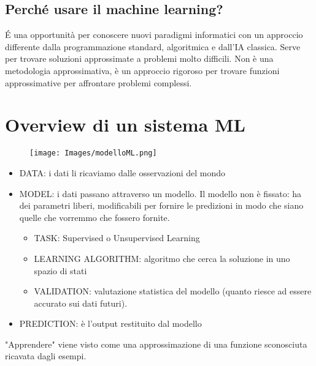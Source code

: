 \documentclass{article}
\begin{document}
\subsection{Perché usare il machine learning?}
É una opportunità per conoscere nuovi paradigmi informatici con un approccio differente dalla programmazione standard, algoritmica e dall'IA classica. Serve per trovare soluzioni approssimate a problemi molto difficili. Non è una metodologia approssimativa, è un approccio rigoroso per trovare funzioni approssimative per affrontare problemi complessi. 

\section{Overview di un sistema ML}
\begin{figure}[H]
    \centering
    \texttt{[image: Images/modelloML.png]}
\end{figure}

\begin{itemize}
    \item DATA: i dati li ricaviamo dalle osservazioni del mondo
    \item MODEL: i dati passano attraverso un modello. Il modello non è fissato: ha dei parametri liberi, modificabili per fornire le predizioni in modo che siano quelle che vorremmo che fossero fornite.
    \begin{itemize}
        \item TASK: Supervised o Unsupervised Learning
        \item LEARNING ALGORITHM: algoritmo che cerca la soluzione in uno spazio di stati
        \item VALIDATION: valutazione statistica del modello (quanto riesce ad essere accurato sui dati futuri). 
    \end{itemize}
    \item PREDICTION: è l'output restituito dal modello
\end{itemize} 
"Apprendere" viene visto come una approssimazione di una funzione sconosciuta ricavata dagli esempi. 
\end{document}
